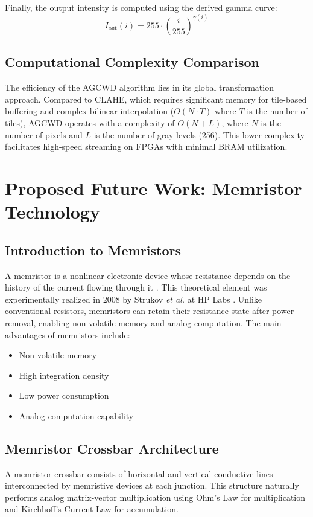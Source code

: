 \documentclass[conference]{IEEEtran}
\begin{document}
Finally, the output intensity is computed using the derived gamma curve:
\begin{equation}
  I_{\text{out}}(i) = 255 \cdot \left(\frac{i}{255}\right)^{\gamma(i)}
  \label{eq:lut}
\end{equation}

\subsection{Computational Complexity Comparison}
The efficiency of the AGCWD algorithm lies in its global transformation approach. Compared to CLAHE, which requires significant memory for tile-based buffering and complex bilinear interpolation ($O(N \cdot T)$ where $T$ is the number of tiles), AGCWD operates with a complexity of $O(N + L)$, where $N$ is the number of pixels and $L$ is the number of gray levels (256). This lower complexity facilitates high-speed streaming on FPGAs with minimal BRAM utilization.

\section{Proposed Future Work: Memristor Technology}
\label{sec:memristor}

\subsection{Introduction to Memristors}
A memristor is a nonlinear electronic device whose resistance depends on the history of the current flowing through it \cite{ref_mem1}. This theoretical element was experimentally realized in 2008 by Strukov \textit{et al.} at HP Labs \cite{ref_mem2}. Unlike conventional resistors, memristors can retain their resistance state after power removal, enabling non-volatile memory and analog computation. The main advantages of memristors include:
\begin{itemize}
    \item Non-volatile memory
    \item High integration density
    \item Low power consumption
    \item Analog computation capability
\end{itemize}

\subsection{Memristor Crossbar Architecture}
A memristor crossbar consists of horizontal and vertical conductive lines interconnected by memristive devices at each junction. This structure naturally performs analog matrix-vector multiplication using Ohm's Law for multiplication and Kirchhoff's Current Law for accumulation.
\end{document}
